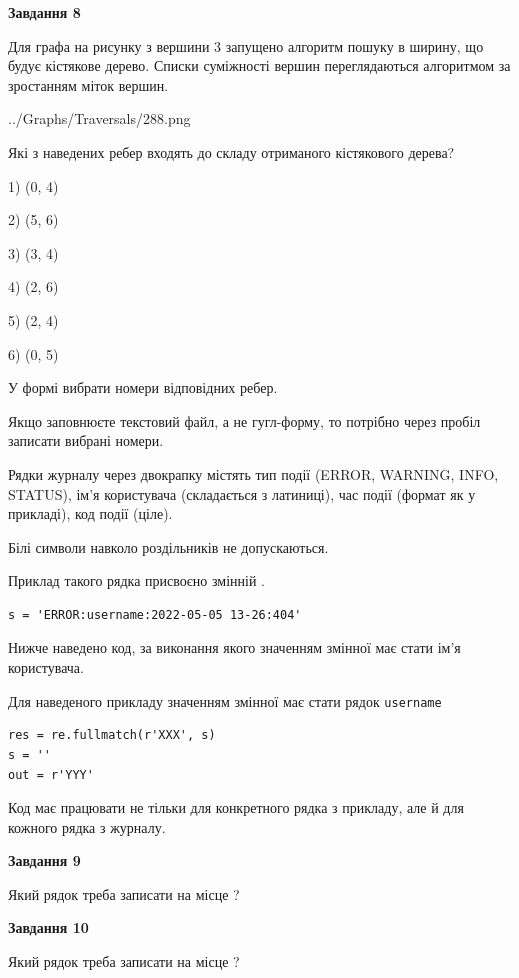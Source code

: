 \documentclass[12pt, ukrainian]{article}
\def\code#1{\Verb!#1!}
\begin{document}
{\begin {large}
{\begin {center}\textbf{Завдання 8}\end {center}}\par
Для графа на рисунку з вершини 3 запущено алгоритм пошуку в ширину, що будує кістякове дерево. Списки суміжності вершин переглядаються алгоритмом за зростанням міток вершин.\par
\begin{center}
	{../Graphs/Traversals/288.png}
\end{center}
\par Які з наведених ребер входять до складу отриманого кістякового дерева?\par
1) (0, 4)\par
2) (5, 6)\par
3) (3, 4)\par
4) (2, 6)\par
5) (2, 4)\par
6) (0, 5)\par
{\vskip 15pt} У формі вибрати номери відповідних ребер.


Якщо заповнюєте текстовий файл, а не гугл-форму, то потрібно через пробіл записа\-ти вибрані номери.\par
\newpage


Рядки журналу через двокрапку містять тип події (ERROR, WARNING, INFO, STATUS), ім'я користувача (складається з латиниці), час події (фор\-мат як у прикладі), код події (ціле).

Білі символи навколо роздільників не допускаються.

Приклад такого рядка присвоєно змінній .



\begin{verbatim}
s = 'ERROR:username:2022-05-05 13-26:404'
\end{verbatim}


Нижче наведено код, за виконання якого значенням змінної  має стати ім'я користувача.

Для наведеного прикладу значенням змінної  має стати рядок \code{username}



\begin{verbatim}
res = re.fullmatch(r'XXX', s)
s = ''
out = r'YYY'
\end{verbatim}


Код має працювати не тільки для конкретного рядка з прикладу, але й для кожного рядка з журналу.

{\begin {center}\textbf{Завдання 9}\end {center}}\par
Який рядок треба записати на місце  ?\par
\vspace{5mm}


{\begin {center}\textbf{Завдання 10}\end {center}}\par
Який рядок треба записати на місце  ?\par


\newpage


\end {large}}
\end{document}
